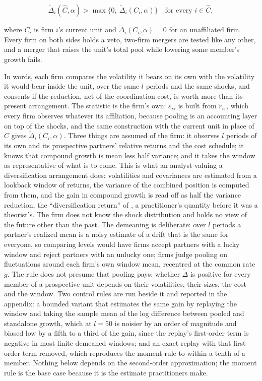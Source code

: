 \documentclass[12pt,a4paper]{article}
\begin{document}
$$\tilde\Delta_i(\hat C, \alpha) > \max\bigl\{0,\ \tilde\Delta_i(C_i, \alpha)\bigr\} \quad \text{for every } i \in \hat C,$$

where $C_i$ is firm $i$'s current unit and $\tilde{\Delta}_i(C_i, \alpha) = 0$ for an unaffiliated firm. Every firm on both sides holds a veto, two-firm mergers are tested like any other, and a merger that raises the unit's total pool while lowering some member's growth fails.

In words, each firm compares the volatility it bears on its own with the volatility it would bear inside the unit, over the same $l$ periods and the same shocks, and consents if the reduction, net of the coordination cost, is worth more than its present arrangement. The statistic is the firm's own: $\varepsilon_{i\tau}$ is built from $\tilde{r}_{i\tau}$, which every firm observes whatever its affiliation, because pooling is an accounting layer on top of the shocks, and the same construction with the current unit in place of $\hat{C}$ gives $\tilde{\Delta}_i(C_i, \alpha)$. Three things are assumed of the firm: it observes $l$ periods of its own and its prospective partners' relative returns and the cost schedule; it knows that compound growth is mean less half variance; and it takes the window as representative of what is to come. This is what an analyst valuing a diversification arrangement does: volatilities and covariances are estimated from a lookback window of returns, the variance of the combined position is computed from them, and the gain in compound growth is read off as half the variance reduction, the ``diversification return'' of \textcite{booth1992diversification}, a practitioner's quantity \parencite{erb2006strategic} before it was a theorist's. The firm does not know the shock distribution and holds no view of the future other than the past. The demeaning is deliberate: over $l$ periods a partner's realized mean is a noisy estimate of a drift that is the same for everyone, so comparing levels would have firms accept partners with a lucky window and reject partners with an unlucky one; firms judge pooling on fluctuations around each firm's own window mean, recentred at the common rate $g$. The rule does not presume that pooling pays: whether $\tilde{\Delta}$ is positive for every member of a prospective unit depends on their volatilities, their sizes, the cost and the window. Two control rules are run beside it and reported in the appendix: a bounded variant that estimates the same gain by replaying the window and taking the sample mean of the log difference between pooled and standalone growth, which at $l = 50$ is noisier by an order of magnitude and biased low by a fifth to a third of the gain, since the replay's first-order term is negative in most finite demeaned windows; and an exact replay with that first-order term removed, which reproduces the moment rule to within a tenth of a member. Nothing below depends on the second-order approximation; the moment rule is the base case because it is the estimate practitioners make. 
\end{document}
